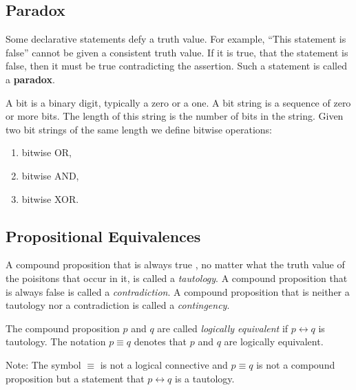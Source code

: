 \subsection{Paradox}
Some declarative statements defy a truth value. For example, ``This statement is false'' cannot be given a consistent truth value. If it is true, that the statement is false, then it must be true contradicting the assertion. Such a statement is called a \textbf{paradox}.


\begin {definition}
A bit is a binary digit, typically a zero or a one. A bit string is a sequence of zero or more bits. The length of this string is the number of bits in the string. Given two bit strings of the same length we define bitwise operations:
\begin{enumerate}
\item bitwise OR, 
\item bitwise AND, 
\item bitwise XOR.
\end {enumerate}
\end{definition}





\subsection {Propositional Equivalences}

\begin {definition}
A compound proposition that is always true , no matter what the truth value of the poisitons that occur in it, is called a \textit{tautology}. A compound proposition that is always false is called a \textit{contradiction}. A compound proposition that is neither a tautology nor a contradiction is called a \textit{contingency}.
\end {definition}

\begin {definition}
The compound proposition $p$ and $q$ are called \textit{logically equivalent} if $p \leftrightarrow q$ is  tautology. The notation $p \equiv q$ denotes that $p$ and $q$ are logically equivalent.
\end {definition}

Note: The symbol $\equiv$ is not a logical connective and $p \equiv q$ is not a compound proposition but a statement that $p \leftrightarrow q$ is a tautology. 

